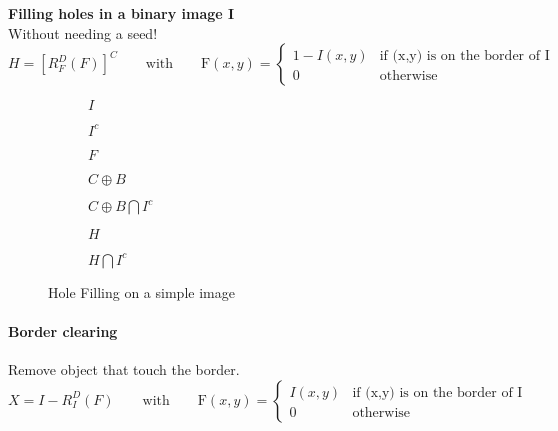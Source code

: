 \textbf{Filling holes in a binary image I}\\
Without needing a seed!\\
\[
	H = [R_F^D(F)]^C  \qquad  \text{with} \qquad \text{F}(x,y)=\begin{cases} 1-I(x,y) & \text{if (x,y) is on the border of I}\\
                                                             0 & \text{otherwise} \end{cases}   
\]
\begin{figure}[h!]
\centering
\begin{subfigure}[b]{0.13\textwidth}
\centering
{}
\caption{$I$}
\end{subfigure}
\begin{subfigure}[b]{0.13\textwidth}
\centering
{}
\caption{$I^c$}
\end{subfigure}
\begin{subfigure}[b]{0.13\textwidth}
\centering
{}
\caption{$F$}
\end{subfigure}
\begin{subfigure}[b]{0.13\textwidth}
\centering
{}
\caption{$C \oplus B$}
\end{subfigure}
\begin{subfigure}[b]{0.13\textwidth}
\centering
{}
\caption{$C \oplus B \bigcap I^c$}
\end{subfigure}
\begin{subfigure}[b]{0.13\textwidth}
\centering
{}
\caption{$H$}
\end{subfigure}
\begin{subfigure}[b]{0.13\textwidth}
\centering
{}
\caption{$H \bigcap I^c$}
\end{subfigure}
\caption{Hole Filling on a simple image}
\end{figure}

\paragraph{Border clearing}
Remove object that touch the border.
\[
X = I-R_I^D(F)  \qquad  \text{with} \qquad \text{F}(x,y)=\begin{cases} I(x,y) & \text{if (x,y) is on the border of I}\\
0 & \text{otherwise} \end{cases}   
\]

